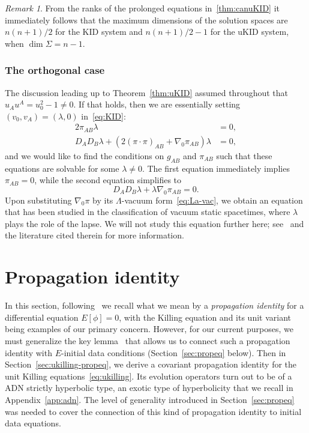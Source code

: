 \documentclass[a4paper]{article}
\theoremstyle{remark}
\newtheorem{rem}{Remark}
\newcommand{\La}{\Lambda}
\newcommand{\la}{\lambda}
\begin{document}
\begin{rem}
From the ranks of the prolonged equations in~\ref{thm:canuKID} it
immediately follows that the maximum dimensions of the solution spaces
are $n(n+1)/2$ for the KID system and $n(n+1)/2-1$ for the uKID system,
when $\dim \Sigma = n-1$.
\end{rem}

\subsubsection{The orthogonal case}

The discussion leading up to Theorem~\ref{thm:uKID} assumed throughout
that $u_A u^A = u_0^2 - 1 \ne 0$. If that holds, then we are essentially
setting $(v_0, v_A) = (\la, 0)$ in~\eqref{eq:KID}:
\begin{equation}
\begin{aligned}
	2\pi_{AB} \la &= 0 ,
	\\
	D_{A} D_{B} \la
	+ (2(\pi\cdot\pi)_{A B} + \nabla_0 \pi_{AB}) \la  &= 0 ,
\end{aligned}
\end{equation}
and we would like to find the conditions on $g_{AB}$ and $\pi_{AB}$ such
that these equations are solvable for some $\la \ne 0$. The first equation
immediately implies $\pi_{AB} = 0$, while the second equation simplifies
to
\[
	D_{A} D_{B} \la + \la \nabla_0 \pi_{AB} = 0 .
\]
Upon substituting $\nabla_0 \pi$ by its $\La$-vacuum
form~\eqref{eq:La-vac}, we obtain an equation that has been studied in the
classification of vacuum static spacetimes, where $\la$ plays the role of
the lapse. We will not study this equation further here;
see~\cite{lafontaine} and the literature cited therein for more
information.

\section{Propagation identity} \label{sec:prop}

In this section, following~\cite[Sec.2]{khgp-ckid} we recall what we
mean by a \emph{propagation identity} for a differential equation
$E[\phi]=0$, with the Killing equation and its unit variant being
examples of our primary concern. However, for our current purposes, we
must generalize the key lemma~\cite[Lem.2.1]{khgp-ckid} that allows us
to connect such a propagation identity with $E$-initial data conditions
(Section~\ref{sec:propeq} below). Then in
Section~\ref{sec:ukilling-propeq}, we derive a covariant propagation
identity for the unit Killing equations~\eqref{eq:ukilling}. Its
evolution operators turn out to be of a ADN strictly hyperbolic type, an exotic
type of hyperbolicity that we recall in Appendix~\ref{app:adn}. The level of
generality introduced in Section~\ref{sec:propeq} was needed to cover the
connection of this kind of propagation identity to initial data equations.
\end{document}
